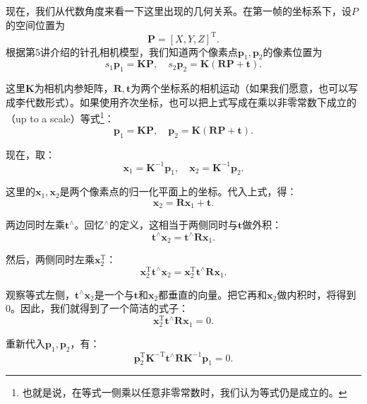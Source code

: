 现在，我们从代数角度来看一下这里出现的几何关系。在第一帧的坐标系下，设$P$的空间位置为
\[
\bm{P}=[X,Y,Z]^\mathrm{T}.
\]
根据第5讲介绍的针孔相机模型，我们知道两个像素点$\bm{p}_1,\bm{p}_2$的像素位置为
\begin{equation}
s_1 {\bm{p}_1} = \bm{KP},\quad s_2 \bm{p}_2 = \bm{K}\left( \bm{RP + t} \right).
\end{equation}

这里$\bm{K}$为相机内参矩阵，$\bm{R}, \bm{t}$为两个坐标系的相机运动（如果我们愿意，也可以写成李代数形式）。如果使用齐次坐标，也可以把上式写成在乘以非零常数下成立的（up to a scale）等式\footnote{也就是说，在等式一侧乘以任意非零常数时，我们认为等式仍是成立的。}：
\begin{equation}
 {\bm{p}_1} = \bm{KP},\quad \bm{p}_2 = \bm{K}\left( \bm{RP + t} \right).
\end{equation}

现在，取：
\begin{equation}
{\bm{x}_1} = {\bm{K}^{ - 1}}{\bm{p}_1}, \quad {\bm{x}_2} = {\bm{K}^{ - 1}}{\bm{p}_2}.
\end{equation}

这里的$\bm{x}_1, \bm{x}_2$是两个像素点的归一化平面上的坐标。代入上式，得：
\begin{equation}
{\bm{x}_2} = \bm{R} {\bm{x}_1} + \bm{t}.
\end{equation}

两边同时左乘$\bm{t}^\wedge$。回忆$^\wedge$的定义，这相当于两侧同时与$\bm{t}$做外积：
\begin{equation}
\bm{t}^\wedge \bm{x}_2 = \bm{t}^\wedge \bm{R} \bm{x}_1.
\end{equation}

然后，两侧同时左乘$\bm{x}_2^\mathrm{T}$：
\begin{equation}
\bm{x}_2^\mathrm{T} \bm{t}^\wedge \bm{x}_2 = \bm{x}_2^\mathrm{T} \bm{t}^\wedge \bm{R} \bm{x}_1.
\end{equation}

观察等式左侧，$\bm{t}^\wedge \bm{x}_2$是一个与$\bm{t}$和$\bm{x}_2$都垂直的向量。把它再和$\bm{x}_2$做内积时，将得到0。因此，我们就得到了一个简洁的式子：
\begin{equation}
 \bm{x}_2^\mathrm{T} \bm{t}^\wedge \bm{R} \bm{x}_1 = 0.
\end{equation}

重新代入$\bm{p}_1, \bm{p}_2$，有：
\begin{equation}
\bm{p}_2^\mathrm{T} \bm{K}^{-\mathrm{T}} \bm{t}^\wedge \bm{R} \bm{K}^{-1} \bm{p}_1  = 0.
\end{equation}

